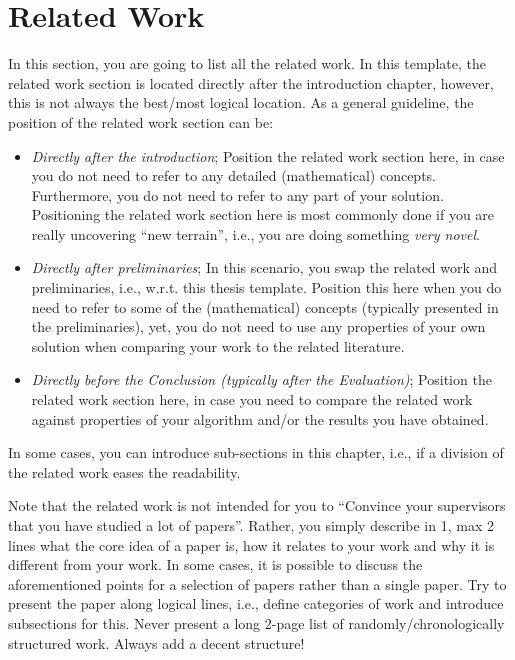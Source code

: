 \chapter{Related Work}
\label{chap:related_work}

In this section, you are going to list all the related work.
In this template, the related work section is located directly after the introduction chapter, however, this is not always the best/most logical location.
As a general guideline, the position of the related work section can be:
\begin{itemize}
	\item \emph{Directly after the introduction}; Position the related work section here, in case you do not need to refer to any detailed (mathematical) concepts.
	      Furthermore, you do not need to refer to any part of your solution.
	      Positioning the related work section here is most commonly done if you are really uncovering \enquote{new terrain}, i.e., you are doing something \emph{very novel}.
	\item \emph{Directly after preliminaries}; In this scenario, you swap the related work and preliminaries, i.e., w.r.t. this thesis template.
	      Position this here when you do need to refer to some of the (mathematical) concepts (typically presented in the preliminaries), yet, you do not need to use any properties of your own solution when comparing your work to the related literature.
	\item \emph{Directly before the Conclusion (typically after the Evaluation)}; Position the related work section here, in case you need to compare the related work against properties of your algorithm and/or the results you have obtained.
\end{itemize}

In some cases, you can introduce sub-sections in this chapter, i.e., if a division of the related work eases the readability.

Note that the related work is not intended for you to \enquote{Convince your supervisors that you have studied a lot of papers}.
Rather, you simply describe in 1, max 2 lines what the core idea of a paper is, how it relates to your work and why it is different from your work.
In some cases, it is possible to discuss the aforementioned points for a selection of papers rather than a single paper.
Try to present the paper along logical lines, i.e., define categories of work and introduce subsections for this.
Never present a long 2-page list of randomly/chronologically structured work.
Always add a decent structure!
